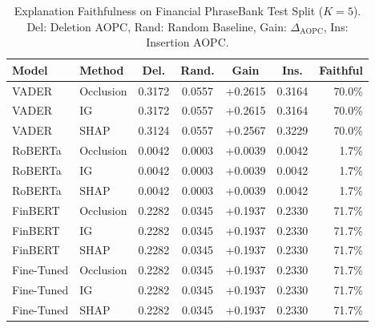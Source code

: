 \begin{table}[t]
\centering
\footnotesize
\setlength{\tabcolsep}{1.8pt}
\caption{Explanation Faithfulness on Financial PhraseBank Test Split ($K=5$). Del: Deletion AOPC, Rand: Random Baseline, Gain: $\Delta_{\text{AOPC}}$, Ins: Insertion AOPC.}
\label{tab:faithfulness}
\begin{tabular}{llccccr}
\toprule
\textbf{Model} & \textbf{Method} & \textbf{Del.} & \textbf{Rand.} & \textbf{Gain} & \textbf{Ins.} & \textbf{Faithful} \\
\midrule
VADER & Occlusion & 0.3172 & 0.0557 & +0.2615 & 0.3164 & 70.0\% \\
VADER & IG & 0.3172 & 0.0557 & +0.2615 & 0.3164 & 70.0\% \\
VADER & SHAP & 0.3124 & 0.0557 & +0.2567 & 0.3229 & 70.0\% \\
RoBERTa & Occlusion & 0.0042 & 0.0003 & +0.0039 & 0.0042 & 1.7\% \\
RoBERTa & IG & 0.0042 & 0.0003 & +0.0039 & 0.0042 & 1.7\% \\
RoBERTa & SHAP & 0.0042 & 0.0003 & +0.0039 & 0.0042 & 1.7\% \\
FinBERT & Occlusion & 0.2282 & 0.0345 & +0.1937 & 0.2330 & 71.7\% \\
FinBERT & IG & 0.2282 & 0.0345 & +0.1937 & 0.2330 & 71.7\% \\
FinBERT & SHAP & 0.2282 & 0.0345 & +0.1937 & 0.2330 & 71.7\% \\
Fine-Tuned & Occlusion & 0.2282 & 0.0345 & +0.1937 & 0.2330 & 71.7\% \\
Fine-Tuned & IG & 0.2282 & 0.0345 & +0.1937 & 0.2330 & 71.7\% \\
Fine-Tuned & SHAP & 0.2282 & 0.0345 & +0.1937 & 0.2330 & 71.7\% \\
\bottomrule
\end{tabular}
\end{table}